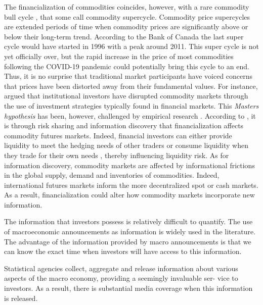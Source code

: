 \documentclass[12pt]{article}
\begin{document}
The financialization of commodities coincides, however, with a rare commodity bull cycle \cite{humphreys2010great}, that some call commodity supercycle. Commodity price supercycles are extended periods of time when commodity prices are significantly above or below their long-term trend. According to the Bank of Canada the last super cycle would have started in 1996 with a peak around 2011. This super cycle is not yet officially over, but the rapid increase in the price of most commodities following the COVID-19 pandemic could potentially bring this cycle to an end. Thus, it is no surprise that traditional market participants have voiced concerns that prices have been distorted  away from their fundamental values. For instance, \citet{masters2009testimony} argued  that institutional investors have disrupted commodity markets through the use of investment strategies typically found in financial markets. This \emph{Masters hypothesis} has been, however, challenged by empirical research \citep{irwin2011index,irwin2012testing,irwin2012financialization}. According to \citet{cheng2014financialization}, it is through risk sharing and information discovery that financialization affects commodity futures markets. Indeed, financial investors can either provide liquidity to meet the hedging needs of other traders or consume liquidity when they trade for their own needs \citep{kang2020tale} , thereby influencing liquidity risk. As for information discovery, commodity markets are affected by informational frictions in the global supply, demand and inventories of commodities. Indeed, international futures markets inform the more decentralized spot or cash markets. As a result, financialization could alter how commodity markets incorporate new information.

The information that investors possess is relatively difficult to quantify. The use of macroeconomic announcements as information is widely used in the literature. The advantage of the information provided by macro announcements is that we can know the exact time when investors will have access to this information.

Statistical agencies collect, aggregate and release information about various aspects of the macro economy, providing a seemingly invaluable ser- vice to investors. As a result, there is substantial media coverage when this information is released.
\end{document}
